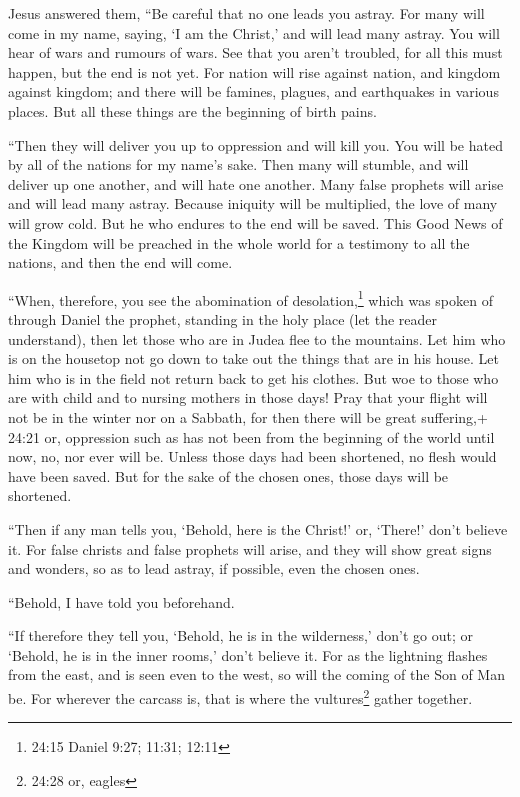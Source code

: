  Jesus answered them, ``Be careful that no one leads you
astray.  For many will come in my name, saying, `I am the
Christ,' and will lead many astray.  You will hear of wars
and rumours of wars. See that you aren't troubled, for all this must
happen, but the end is not yet.  For nation will rise
against nation, and kingdom against kingdom; and there will be famines,
plagues, and earthquakes in various places.  But all these
things are the beginning of birth pains.

 ``Then they will deliver you up to oppression and will kill
you. You will be hated by all of the nations for my name's sake.
 Then many will stumble, and will deliver up one another,
and will hate one another.  Many false prophets will arise
and will lead many astray.  Because iniquity will be
multiplied, the love of many will grow cold.  But he who
endures to the end will be saved.  This Good News of the
Kingdom will be preached in the whole world for a testimony to all the
nations, and then the end will come.

 ``When, therefore, you see the abomination of
desolation,\footnote{24:15 Daniel 9:27; 11:31; 12:11} which was spoken
of through Daniel the prophet, standing in the holy place (let the
reader understand),  then let those who are in Judea flee
to the mountains.  Let him who is on the housetop not go
down to take out the things that are in his house.  Let him
who is in the field not return back to get his clothes. 
But woe to those who are with child and to nursing mothers in those
days!  Pray that your flight will not be in the winter nor
on a Sabbath,  for then there will be great suffering,+
24:21 or, oppression such as has not been from the beginning of the
world until now, no, nor ever will be.  Unless those days
had been shortened, no flesh would have been saved. But for the sake of
the chosen ones, those days will be shortened.

 ``Then if any man tells you, `Behold, here is the Christ!'
or, `There!' don't believe it.  For false christs and false
prophets will arise, and they will show great signs and wonders, so as
to lead astray, if possible, even the chosen ones.

 ``Behold, I have told you beforehand.

 ``If therefore they tell you, `Behold, he is in the
wilderness,' don't go out; or `Behold, he is in the inner rooms,' don't
believe it.  For as the lightning flashes from the east,
and is seen even to the west, so will the coming of the Son of Man be.
 For wherever the carcass is, that is where the
vultures\footnote{24:28 or, eagles} gather together.

